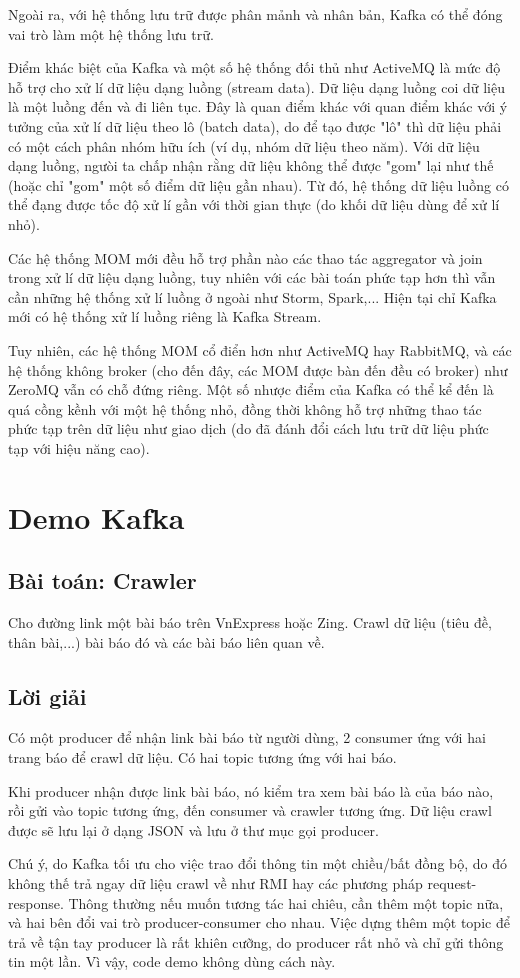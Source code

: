 \documentclass{article}
\begin{document}
Ngoài ra, với hệ thống lưu trữ được phân mảnh và nhân bản, Kafka có thể đóng vai
trò làm một hệ thống lưu trữ.

Điểm khác biệt của Kafka và một số hệ thống đối thủ như ActiveMQ là mức độ hỗ
trợ cho xử lí dữ liệu dạng luồng (stream data). Dữ liệu dạng luồng coi dữ liệu
là một luồng đến và đi liên tục. Đây là quan điểm khác với quan điểm khác với ý
tưởng của xử lí dữ liệu theo lô (batch data), do để tạo được "lô" thì dữ liệu
phải có một cách phân nhóm hữu ích (ví dụ, nhóm dữ liệu theo năm). Với dữ liệu
dạng luồng, ngưòi ta chấp nhận rằng dữ liệu không thể được "gom" lại như thế
(hoặc chỉ "gom" một số điểm dữ liệu gần nhau). Từ đó, hệ thống dữ liệu luồng có
thể đạng được tốc độ xử lí gần với thời gian thực (do khối dữ liệu dùng để xử lí
nhỏ).

Các hệ thống MOM mới đều hỗ trợ phần nào các thao tác aggregator và join trong
xử lí dữ liệu dạng luồng, tuy nhiên với các bài toán phức tạp hơn thì vẫn cần
những hệ thống xử lí luồng ở ngoài như Storm, Spark,... Hiện tại chỉ Kafka mới
có hệ thống xử lí luồng riêng là Kafka Stream.

Tuy nhiên, các hệ thống MOM cổ điển hơn như ActiveMQ hay RabbitMQ, và các hệ
thống không broker (cho đến đây, các MOM được bàn đến đều có broker) như ZeroMQ
vẫn có chỗ đứng riêng. Một số nhược điểm của Kafka có thể kể đến là quá cồng
kềnh với một hệ thống nhỏ, đồng thời không hỗ trợ những thao tác phức tạp trên
dữ liệu như giao dịch (do đã đánh đổi cách lưu trữ dữ liệu phức tạp với hiệu
năng cao).

\section{Demo Kafka}

\subsection{Bài toán: Crawler}

Cho đường link một bài báo trên VnExpress hoặc Zing. Crawl dữ liệu (tiêu đề,
thân bài,...) bài báo đó và các bài báo liên quan về.

\subsection{Lời giải}

Có một producer để nhận link bài báo từ người dùng, 2 consumer ứng với hai trang
báo để crawl dữ liệu. Có hai topic tương ứng với hai báo.

Khi producer nhận được link bài báo, nó kiểm tra xem bài báo là của báo nào, rồi
gửi vào topic tương ứng, đến consumer và crawler tương ứng. Dữ liệu crawl được
sẽ lưu lại ở dạng JSON và lưu ở thư mục gọi producer.

Chú ý, do Kafka tối ưu cho việc trao đổi thông tin một chiều/bất đồng bộ, do đó
không thế trả ngay dữ liệu crawl về như RMI hay các phương pháp
request-response. Thông thường nếu muốn tương tác hai chiêu, cần thêm một topic
nữa, và hai bên đổi vai trò producer-consumer cho nhau. Việc dựng thêm một topic
để trả về tận tay producer là rất khiên cưỡng, do producer rất nhỏ và chỉ gửi
thông tin một lần. Vì vậy, code demo không dùng cách này.

\printbibliography
\end{document}
